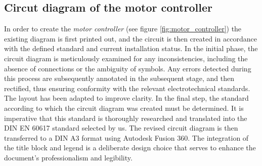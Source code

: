 
\addtocounter{page}{1} %

\subsection{Circut diagram of the motor controller}

In order to create the \textit{motor controller} (see figure \ref{fig:motor_controller}) the existing diagram is first printed out, and the circuit is then created in accordance with the defined standard and current installation status. In the initial phase, the circuit diagram is meticulously examined for any inconsistencies, including the absence of connections or the ambiguity of symbols. Any errors detected during this process are subsequently annotated in the subsequent stage, and then rectified, thus ensuring conformity with the relevant electrotechnical standards. The layout has been adapted to improve clarity. In the final step, the standard according to which the circuit diagram was created must be determined. It is imperative that this standard is thoroughly researched and translated into the DIN EN 60617 standard selected by us. The revised circuit diagram is then transferred to a DIN A3 format using Autodesk Fusion 360. The integration of the title block and legend is a deliberate design choice that serves to enhance the document's professionalism and legibility.

